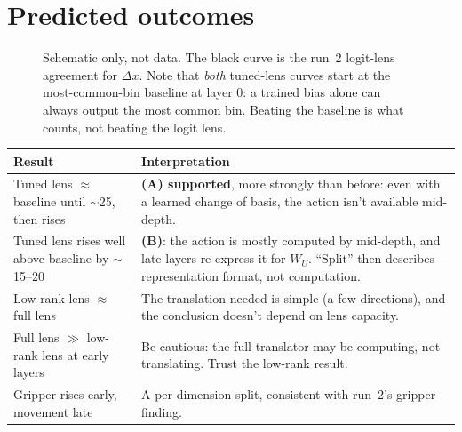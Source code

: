 \documentclass[11pt]{article}
\begin{document}
\section{Predicted outcomes}

\begin{figure}[h]
\centering
{}
\caption{Schematic only, not data. The black curve is the run~2 logit-lens agreement for $\Delta x$. Note that \emph{both} tuned-lens curves start at the most-common-bin baseline at layer 0: a trained bias alone can always output the most common bin. Beating the baseline is what counts, not beating the logit lens.}
\label{fig:outcomes}
\end{figure}

\begin{center}
\begin{tabularx}{\linewidth}{@{}lX@{}}
\toprule
Result & Interpretation \\
\midrule
Tuned lens $\approx$ baseline until $\sim$25, then rises & \textbf{(A) supported}, more strongly than before: even with a learned change of basis, the action isn't available mid-depth. \\
Tuned lens rises well above baseline by $\sim$15--20 & \textbf{(B)}: the action is mostly computed by mid-depth, and late layers re-express it for $W_U$. ``Split'' then describes representation format, not computation. \\
Low-rank lens $\approx$ full lens & The translation needed is simple (a few directions), and the conclusion doesn't depend on lens capacity. \\
Full lens $\gg$ low-rank lens at early layers & Be cautious: the full translator may be computing, not translating. Trust the low-rank result. \\
Gripper rises early, movement late & A per-dimension split, consistent with run~2's gripper finding. \\
\bottomrule
\end{tabularx}
\end{center}
\end{document}
